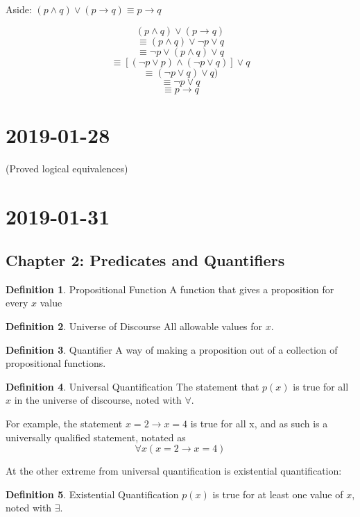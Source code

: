 \documentclass{article}
\theoremstyle{definition}
\newtheorem{definition}{Definition}[section]
\begin{document}
Aside: $(p \land q) \lor (p \rightarrow q) \equiv p \rightarrow q$

$$(p \land q) \lor (p \rightarrow q)$$
$$\equiv (p \land q) \lor \neg p \lor q$$
$$\equiv \neg p \lor (p \land q) \lor q$$
$$\equiv [(\neg p \lor p) \land (\neg p \lor q)] \lor q$$
$$\equiv (\neg p \lor q) \lor q)$$
$$\equiv \neg p \lor q$$
$$\equiv p \rightarrow q$$
 
\section*{2019-01-28}

(Proved logical equivalences)

\section*{2019-01-31}

\subsection*{Chapter 2: Predicates and Quantifiers}

\begin{definition}{Propositional Function}
  A function that gives a proposition for every $x$ value
\end{definition}

\begin{definition}{Universe of Discourse}
  All allowable values for $x$.
\end{definition}

\begin{definition}{Quantifier}
  A way of making a proposition out of a collection of propositional functions.
\end{definition}

\begin{definition}{Universal Quantification}
  The statement that $p(x)$ is true for all $x$ in the universe of discourse,
  noted with $\forall$.
\end{definition}

For example, the statement $x=2 \rightarrow x=4$ is true for all x, and as such
is a universally qualified statement, notated as
$$\forall x (x=2 \rightarrow x=4)$$

At the other extreme from universal quantification is existential
quantification:

\begin{definition}{Existential Quantification}
  $p(x)$ is true for at least one value of $x$, noted with $\exists$.
\end{definition}
\end{document}
